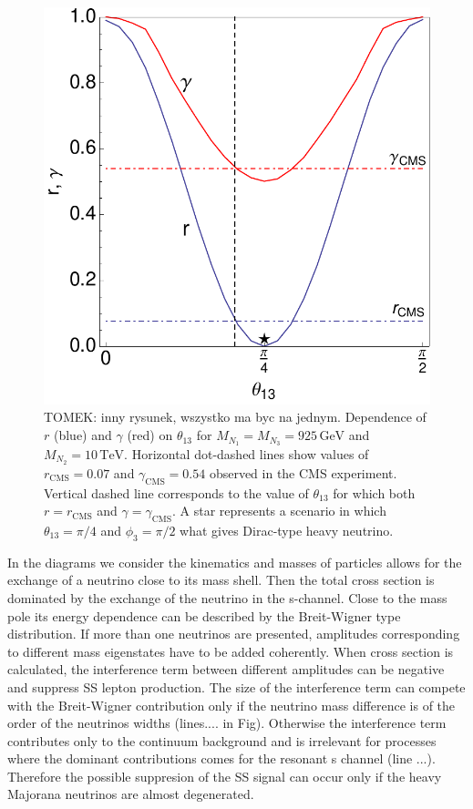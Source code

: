 \documentclass[twocolumn,superscriptaddress,showpacs,prl,nofootinbib,floatfix]{revtex4}
\begin{document}
\begin{figure}[h!]
\begin{center}
\includegraphics[scale=0.55]{splitting0GeV-2}
\caption{
TOMEK: inny rysunek, wszystko ma byc na jednym. 
Dependence of $r$ (blue) and $\gamma$ (red) on $\theta_{13}$ for $M_{N_1}=M_{N_3}=925\,\mathrm{GeV}$ and $M_{N_2}=10\,\mathrm{TeV}$. Horizontal dot-dashed lines show values of $r_{\mathrm{CMS}}=0.07$ and $\gamma_{\mathrm{CMS}}=0.54$ observed in the CMS experiment. Vertical dashed line corresponds to the value of $\theta_{13}$ for which both $r=r_{\mathrm{CMS}}$ and $\gamma=\gamma_{\mathrm{CMS}}$. A star represents a scenario in which  $\theta_{13}=\pi/4$ and $\phi_3=\pi/2$ what gives Dirac-type heavy neutrino.} \label{figr1}
\end{center}
\end{figure}
 

In the diagrams we consider the kinematics and masses of particles allows for the exchange of a neutrino close to its mass shell. Then the total cross section is dominated by the exchange of the neutrino in the s-channel. Close to the mass pole its energy dependence can be described by the Breit-Wigner type distribution. If more  than one neutrinos are presented, amplitudes corresponding to different mass eigenstates have to be added coherently. When cross section is calculated,  the interference term between different amplitudes can be negative and suppress SS lepton production. The size of the interference term can compete with the Breit-Wigner contribution only if the neutrino mass difference is of the order of the neutrinos widths (lines.... in Fig). Otherwise the interference term contributes only to the continuum background and is irrelevant for processes where the dominant contributions comes for the resonant s channel (line ...). Therefore the possible suppresion of the SS signal can occur only if the heavy Majorana neutrinos are almost degenerated. 
\end{document}
